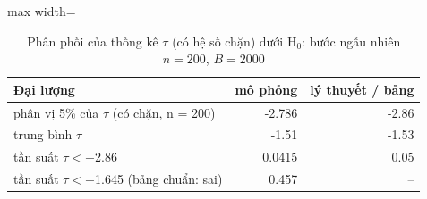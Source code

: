\begin{table}[H]
\centering\small
\caption{Phân phối của thống kê $\tau$ (có hệ số chặn) dưới H$_0$: bước ngẫu nhiên $n=200$, $B=2000$}\label{tab:tab_b12_04_null_distribution}
\begin{adjustbox}{max width=\linewidth}
\begin{tabular}{>{\raggedright\arraybackslash}p{}rr}
\toprule
Đại lượng & mô phỏng & lý thuyết / bảng \\
\midrule
phân vị 5\% của $\tau$ (có chặn, n = 200) & -2.786 & -2.86 \\
trung bình $\tau$ & -1.51 & -1.53 \\
tần suất $\tau < -$2.86 & 0.0415 & 0.05 \\
tần suất $\tau < -$1.645 (bảng chuẩn: sai) & 0.457 & – \\
\bottomrule
\end{tabular}
\end{adjustbox}
\end{table}
